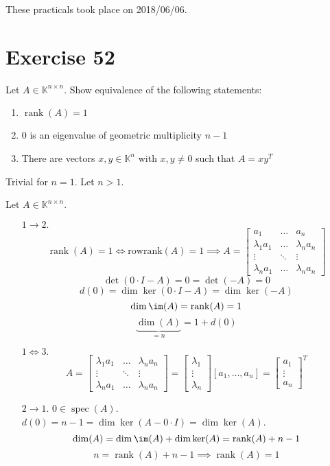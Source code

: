 \documentclass[a4paper]{article}
\theoremstyle{definition}
\newcommand\dateref[1]{These practicals took place on #1.\par}
\DeclareMathOperator\rank{rank}
\begin{document}
\dateref{2018/06/06}

\section{Exercise 52}
\begin{ex}
  Let $A \in \mathbb K^{n \times n}$. Show equivalence of the following statements:
  \begin{enumerate}
    \item $\rank(A) = 1$
    \item $0$ is an eigenvalue of geometric multiplicity $n-1$
    \item There are vectors $x, y \in \mathbb K^n$ with $x, y \neq 0$ such that $A = xy^T$
  \end{enumerate}
\end{ex}

Trivial for $n = 1$. Let $n > 1$.

Let $A \in \mathbb K^{n \times n}$.
\begin{enumerate}
  \item[$1 \to 2.$]
    \[ \rank(A) = 1 \iff \text{rowrank}(A) = 1 \implies A = \begin{bmatrix} a_1 & \dots & a_n \\ \lambda_1 a_1 & \dots & \lambda_n a_n \\ \vdots & \ddots & \vdots \\ \lambda_n a_1 & \dots & \lambda_n a_n \end{bmatrix} \]
    \[ \det(0 \cdot I - A) = 0 = \det(-A) = 0 \]
    \[ d(0) = \dim\ker(0 \cdot I - A) = \dim\ker(-A) \]
    \[ \dim\im(A) = \rank(A) = 1 \]
    \[ \underbrace{\dim(A)}_{= n} = 1 + d(0) \]
  \item[$1 \iff 3.$]
    \[
      A
      = \begin{bmatrix} \lambda_1 a_1 & \dots & \lambda_n a_n \\ \vdots & \ddots & \vdots \\ \lambda_n a_1 & \dots & \lambda_n a_n \end{bmatrix}
      = \begin{bmatrix} \lambda_1 \\ \vdots \\ \lambda_n \end{bmatrix} [a_1, \dots, a_n]
      = \begin{bmatrix} a_1 \\ \vdots \\ a_n \end{bmatrix}^T
    \]
  \item[$2 \to 1.$]
    $0 \in \operatorname{spec}(A)$. $d(0) = n - 1 = \dim\ker(A - 0 \cdot I) = \dim\ker(A)$.
    \[ \dim(A) = \dim\im(A) + \dim\ker(A) = \rank(A) + n - 1 \]
    \[ n = \rank(A) + n - 1 \implies \rank(A) = 1 \]
\end{enumerate}
\end{document}
